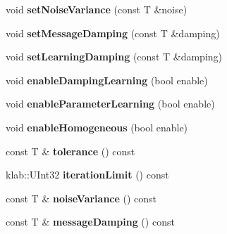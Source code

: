 \begin{DoxyCompactItemize}
\item 
void {\bfseries set\+Noise\+Variance} (const T \&noise)\hypertarget{classkl1p_1_1TEMBPSolver_af62b389f6722883a4c50e77e4691f54b}{}\label{classkl1p_1_1TEMBPSolver_af62b389f6722883a4c50e77e4691f54b}

\item 
void {\bfseries set\+Message\+Damping} (const T \&damping)\hypertarget{classkl1p_1_1TEMBPSolver_a305cd56334caefb0119ac46d81494ecc}{}\label{classkl1p_1_1TEMBPSolver_a305cd56334caefb0119ac46d81494ecc}

\item 
void {\bfseries set\+Learning\+Damping} (const T \&damping)\hypertarget{classkl1p_1_1TEMBPSolver_a3ed2ed7b5f64b3469b2c76c0129aec05}{}\label{classkl1p_1_1TEMBPSolver_a3ed2ed7b5f64b3469b2c76c0129aec05}

\item 
void {\bfseries enable\+Damping\+Learning} (bool enable)\hypertarget{classkl1p_1_1TEMBPSolver_a2943dbc17a474ec05336cfac88d02fda}{}\label{classkl1p_1_1TEMBPSolver_a2943dbc17a474ec05336cfac88d02fda}

\item 
void {\bfseries enable\+Parameter\+Learning} (bool enable)\hypertarget{classkl1p_1_1TEMBPSolver_a3a1a8dfa6262c60276d6fbdf49634480}{}\label{classkl1p_1_1TEMBPSolver_a3a1a8dfa6262c60276d6fbdf49634480}

\item 
void {\bfseries enable\+Homogeneous} (bool enable)\hypertarget{classkl1p_1_1TEMBPSolver_ad7693a301d0a6079a9150ed82352ec64}{}\label{classkl1p_1_1TEMBPSolver_ad7693a301d0a6079a9150ed82352ec64}

\item 
const T \& {\bfseries tolerance} () const \hypertarget{classkl1p_1_1TEMBPSolver_afc6bf6a1c0a0bda420705f3777df8156}{}\label{classkl1p_1_1TEMBPSolver_afc6bf6a1c0a0bda420705f3777df8156}

\item 
klab\+::\+U\+Int32 {\bfseries iteration\+Limit} () const \hypertarget{classkl1p_1_1TEMBPSolver_aa310ef9f0fd27b73d9bc2ccd78e83faf}{}\label{classkl1p_1_1TEMBPSolver_aa310ef9f0fd27b73d9bc2ccd78e83faf}

\item 
const T \& {\bfseries noise\+Variance} () const \hypertarget{classkl1p_1_1TEMBPSolver_a5c8ba3811fd115c8a6ca1f608118a3fb}{}\label{classkl1p_1_1TEMBPSolver_a5c8ba3811fd115c8a6ca1f608118a3fb}

\item 
const T \& {\bfseries message\+Damping} () const \hypertarget{classkl1p_1_1TEMBPSolver_a088e1674c71dfca92e068336cb44fa9d}{}\label{classkl1p_1_1TEMBPSolver_a088e1674c71dfca92e068336cb44fa9d}


\end{DoxyCompactItemize}

